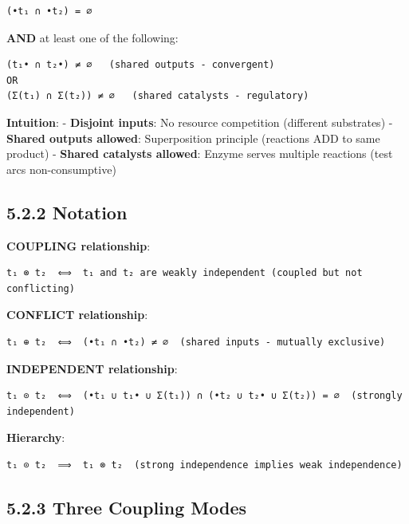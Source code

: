 \begin{lstlisting}
(•t₁ ∩ •t₂) = ∅
\end{lstlisting}

\textbf{AND} at least one of the following:

\begin{lstlisting}
(t₁• ∩ t₂•) ≠ ∅   (shared outputs - convergent)
OR
(Σ(t₁) ∩ Σ(t₂)) ≠ ∅   (shared catalysts - regulatory)
\end{lstlisting}

\textbf{Intuition}: - \textbf{Disjoint inputs}: No resource competition
(different substrates) - \textbf{Shared outputs allowed}: Superposition
principle (reactions ADD to same product) - \textbf{Shared catalysts
allowed}: Enzyme serves multiple reactions (test arcs non-consumptive)

\hypertarget{notation}{%
\subsection{5.2.2 Notation}\label{notation}}

\textbf{COUPLING relationship}:

\begin{lstlisting}
t₁ ⊗ t₂  ⟺  t₁ and t₂ are weakly independent (coupled but not conflicting)
\end{lstlisting}

\textbf{CONFLICT relationship}:

\begin{lstlisting}
t₁ ⊕ t₂  ⟺  (•t₁ ∩ •t₂) ≠ ∅  (shared inputs - mutually exclusive)
\end{lstlisting}

\textbf{INDEPENDENT relationship}:

\begin{lstlisting}
t₁ ⊙ t₂  ⟺  (•t₁ ∪ t₁• ∪ Σ(t₁)) ∩ (•t₂ ∪ t₂• ∪ Σ(t₂)) = ∅  (strongly independent)
\end{lstlisting}

\textbf{Hierarchy}:

\begin{lstlisting}
t₁ ⊙ t₂  ⟹  t₁ ⊗ t₂  (strong independence implies weak independence)
\end{lstlisting}

\hypertarget{three-coupling-modes}{%
\subsection{5.2.3 Three Coupling Modes}\label{three-coupling-modes}}

